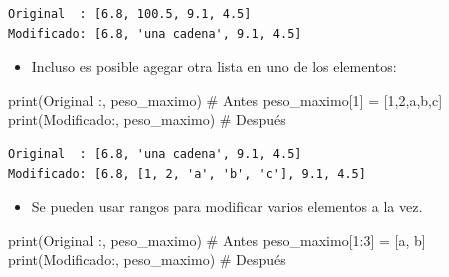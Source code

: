 \documentclass[
  spanish,
  letterpaper,
]{scrbook}
\newenvironment{Shaded}{\begin{snugshade}}{\end{snugshade}}
\newcommand{\BuiltInTok}[1]{\textcolor[rgb]{0.00,0.23,0.31}{#1}}
\newcommand{\CommentTok}[1]{\textcolor[rgb]{0.37,0.37,0.37}{#1}}
\newcommand{\DecValTok}[1]{\textcolor[rgb]{0.68,0.00,0.00}{#1}}
\newcommand{\NormalTok}[1]{\textcolor[rgb]{0.00,0.23,0.31}{#1}}
\newcommand{\OperatorTok}[1]{\textcolor[rgb]{0.37,0.37,0.37}{#1}}
\newcommand{\StringTok}[1]{\textcolor[rgb]{0.13,0.47,0.30}{#1}}
\providecommand{\tightlist}{%
  \setlength{\itemsep}{0pt}\setlength{\parskip}{0pt}}
\theoremstyle{definition}
\theoremstyle{remark}
\begin{document}
\begin{verbatim}
Original  : [6.8, 100.5, 9.1, 4.5]
Modificado: [6.8, 'una cadena', 9.1, 4.5]
\end{verbatim}

\begin{itemize}
\tightlist
\item
  Incluso es posible agegar otra lista en uno de los elementos:
\end{itemize}

\begin{Shaded}
\begin{Highlighting}[]
\BuiltInTok{print}\NormalTok{(}\StringTok{\textquotesingle{}Original  :\textquotesingle{}}\NormalTok{, peso\_maximo) }\CommentTok{\# Antes}
\NormalTok{peso\_maximo[}\DecValTok{1}\NormalTok{] }\OperatorTok{=}\NormalTok{ [}\DecValTok{1}\NormalTok{,}\DecValTok{2}\NormalTok{,}\StringTok{\textquotesingle{}a\textquotesingle{}}\NormalTok{,}\StringTok{\textquotesingle{}b\textquotesingle{}}\NormalTok{,}\StringTok{\textquotesingle{}c\textquotesingle{}}\NormalTok{] }
\BuiltInTok{print}\NormalTok{(}\StringTok{\textquotesingle{}Modificado:\textquotesingle{}}\NormalTok{, peso\_maximo) }\CommentTok{\# Después}
\end{Highlighting}
\end{Shaded}

\begin{verbatim}
Original  : [6.8, 'una cadena', 9.1, 4.5]
Modificado: [6.8, [1, 2, 'a', 'b', 'c'], 9.1, 4.5]
\end{verbatim}

\begin{itemize}
\tightlist
\item
  Se pueden usar rangos para modificar varios elementos a la vez.
\end{itemize}

\begin{Shaded}
\begin{Highlighting}[]
\BuiltInTok{print}\NormalTok{(}\StringTok{\textquotesingle{}Original  :\textquotesingle{}}\NormalTok{, peso\_maximo) }\CommentTok{\# Antes}
\NormalTok{peso\_maximo[}\DecValTok{1}\NormalTok{:}\DecValTok{3}\NormalTok{] }\OperatorTok{=}\NormalTok{ [}\StringTok{\textquotesingle{}a\textquotesingle{}}\NormalTok{, }\StringTok{\textquotesingle{}b\textquotesingle{}}\NormalTok{] }
\BuiltInTok{print}\NormalTok{(}\StringTok{\textquotesingle{}Modificado:\textquotesingle{}}\NormalTok{, peso\_maximo) }\CommentTok{\# Después}
\end{Highlighting}
\end{Shaded}
\end{document}

